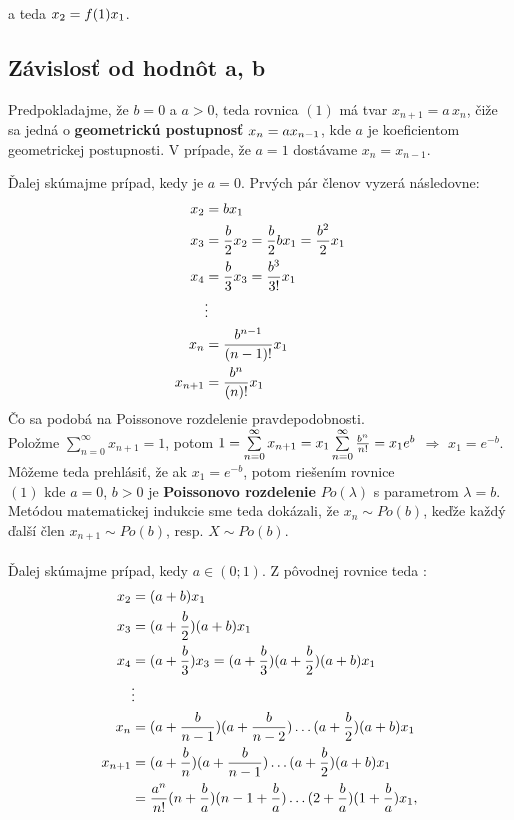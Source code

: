 \documentclass[a4paper,10pt]{article}
\theoremstyle{plain}
\theoremstyle{definition}
\begin{document}
\noindent a teda $ x_{2} = f(1)\*x_{1} $. 

\subsection{Závislosť od hodnôt a, b}

Predpokladajme, že $ b=0 $ a $ a > 0 $, teda rovnica $ (1) $ má tvar $ x_{n+1} = a\,x_{n} $, čiže sa jedná o \textbf{geometrickú postupnosť}
$ x_{n} = a\*x_{n-1} $, kde $ a $ je koeficientom geometrickej postupnosti. V prípade, že $ a = 1 $ dostávame $ x_{n} = x_{n-1} $.


Ďalej skúmajme prípad, kedy je $ a=0 $. Prvých pár členov vyzerá následovne: 
\begin{align*}
x_{2}&=b\*x_{1}\\
x_{3}&=\frac{b}{2}\*x_{2} = \frac{b}{2}\*b\*x_{1}=\frac{b^{2}}{2}\*x_{1} \\
x_{4}&=\frac{b}{3}\*x_{3} = \frac{b^{3}}{3!}\*x_{1}  \\
&\vdots \\
x_{n}&=\frac{b^{n-1}}{(n-1)!}\*x_{1}    \\
x_{n+1}&=\frac{b^{n}}{(n)!}\*x_{1}   \\
\end{align*}
Čo sa podobá na Poissonove rozdelenie pravdepodobnosti. \\
Položme $ \sum\limits_{n=0}^\infty x_{n+1} = 1 $, potom $ 1=\sum\limits_{n=0}^\infty x_{n+1} = x_{1}\*\sum\limits_{n=0}^\infty \frac{b^{n}}{n!} = x_{1}\*e^{b}$ $ \Rightarrow $ $ x_{1} = e^{-b} $.
Môžeme teda prehlásiť, že ak $x_{1}=e^{-b} $, potom riešením rovnice\\
$(1)$ kde $a=0$, $b>0$
je \textbf{Poissonovo rozdelenie} $Po(\lambda)$ s parametrom $\lambda=b$.\\
Metódou matematickej indukcie sme teda dokázali, že $x_{n}\sim Po(b)$, keďže každý ďalší člen $x_{n+1}\sim Po(b)$, resp. $ X \sim Po(b)$.\\
\\Ďalej skúmajme prípad, kedy $ a \in (0;1) $. Z pôvodnej rovnice teda :
\begin{align*}
x_{2}&=(a+b)\*x_{1} \\
x_{3}&=(a + \frac{b}{2}) \* (a + b)\*x_{1} \\
x_{4}&=(a + \frac{b}{3})\*x_{3}= (a + \frac{b}{3})\*(a + \frac{b}{2})\*(a + b)\*x_{1} \\
&\vdots \\
x_{n}&=(a + \frac{b}{n-1})\*(a + \frac{b}{n-2}) \ldots (a + \frac{b}{2})\*(a + b)\*x_{1}\\
x_{n+1}&=(a + \frac{b}{n})\*(a + \frac{b}{n-1}) \ldots (a + \frac{b}{2})\*(a + b)\*x_{1}\\
&=\frac{a^{n}}{n!}\*(n + \frac{b}{a})\*(n-1 + \frac{b}{a}) \ldots (2 + \frac{b}{a})\*(1 + \frac{b}{a})\*x_{1},
\end{align*}
\end{document}
